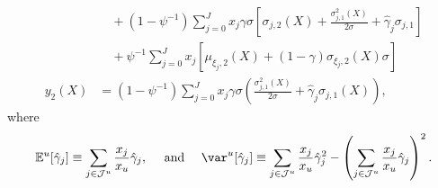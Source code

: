 \begin{prop}
\begin{enumerate}[(i)]
\begin{align}
			&\quad+ \left(1-\psi^{-1}\right) \sum_{j=0}^J x_{j} \gamma\sigma \left[ \sigma_{j,2}(X) + \frac{\sigma_{j,1}^2(X)}{2 \sigma} + \hat{\gamma}_j \sigma_{j,1} \right]\nonumber\\
			&\quad+\psi^{-1} \sum_{j=0}^J x_{j}\left[ \mu_{\xi_j,2}(X) + (1-\gamma) \sigma_{\xi_j,2}(X) \sigma \right]\\
            y_2(X) &= \left(1-\psi^{-1}\right)\sum_{j=0}^{J} x_{j} \gamma \sigma\left(\frac{\sigma_{j, 1}^{2}(X)}{2 \sigma}+\hat{\gamma}_{j} \sigma_{j, 1}(X)\right),\label{eq:y-second-order}
		\end{align}
		where 
		\[\mathbb{E}^{u}[\hat{\gamma}_{j}] \equiv \sum_{j \in \mathcal{J}^{u}} \frac{x_{j}}{x_{u}} \hat{\gamma}_{j}, \quad \text { and } \quad \var^{u}[\hat{\gamma}_{j}] \equiv \sum_{j \in \mathcal{J}^{u}} \frac{x_{j}}{x_{u}} \hat{\gamma}_{j}^{2}-\left(\sum_{j \in \mathcal{J}^{u}} \frac{x_{j}}{x_{u}} \hat{\gamma}_{j}\right)^{2}.\]
	\end{enumerate}
\end{prop}
